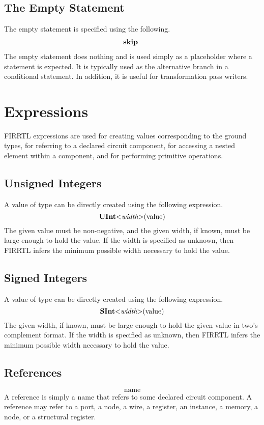 \documentclass[12pt]{article}
\begin{document}
\subsection{The Empty Statement}
The empty statement is specified using the following.
\[
\begin{aligned}
\text{\bf skip\ }
\end{aligned}
\]
The empty statement does nothing and is used simply as a placeholder where a statement is expected.
It is typically used as the alternative branch in a conditional statement. 
In addition, it is useful for transformation pass writers.

\section{Expressions}

FIRRTL expressions are used for creating values corresponding to the ground types, for referring to a declared circuit component, for accessing a nested element within a component, and for performing primitive operations. 

\subsection{Unsigned Integers}

A value of type  can be directly created using the following expression.
\[
\text{\bf UInt}\text{\bf $<$} \text{\em width} \text{\bf $>$}(\text{value})
\]
The given value must be non-negative, and the given width, if known, must be large enough to hold the value.
If the width is specified as unknown, then FIRRTL infers the minimum possible width necessary to hold the value.

\subsection{Signed Integers}

A value of type  can be directly created using the following expression.
\[
\text{\bf SInt}\text{\bf $<$} \text{\em width} \text{\bf $>$}(\text{value})
\]
The given width, if known, must be large enough to hold the given value in two's complement format.
If the width is specified as unknown, then FIRRTL infers the minimum possible width necessary to hold the value.

\subsection{References}
\[
\text{name}
\]
A reference is simply a name that refers to some declared circuit component.
A reference may refer to a port, a node, a wire, a register, an instance, a memory, a node, or a structural register.
\end{document}
